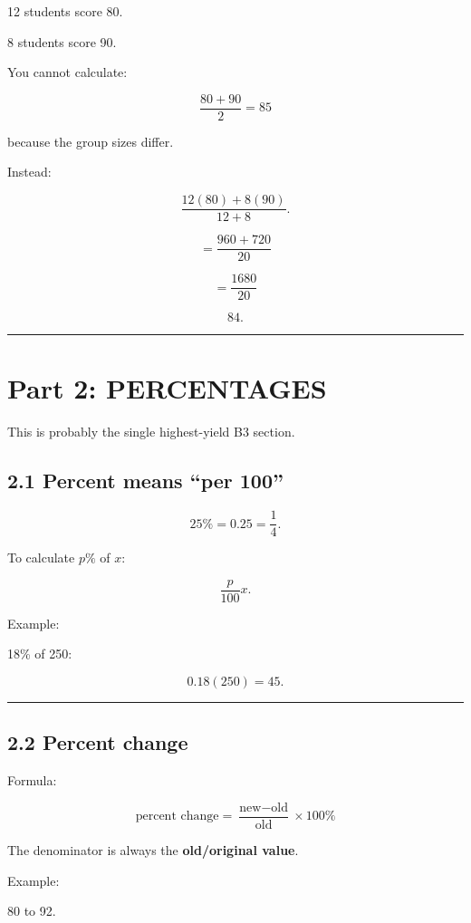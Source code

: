 \documentclass[
]{article}
\begin{document}
12 students score 80.

8 students score 90.

You cannot calculate:

\[
\frac{80+90}{2}=85
\]

because the group sizes differ.

Instead:

\[
\frac{12(80)+8(90)}{12+8}.
\]

\[
=
\frac{960+720}{20}
\]

\[
=
\frac{1680}{20}
\]

\[
\boxed{84}.
\]

\begin{center}\rule{0.5\linewidth}{0.5pt}\end{center}

\section{Part 2: PERCENTAGES}\label{part-2-percentages}

This is probably the single highest-yield B3 section.

\subsection{2.1 Percent means ``per 100''}\label{percent-means-per-100}

\[
25\%=0.25=\frac14.
\]

To calculate \(p\%\) of \(x\):

\[
\boxed{\frac p{100}x}.
\]

Example:

18\% of 250:

\[
0.18(250)=45.
\]

\begin{center}\rule{0.5\linewidth}{0.5pt}\end{center}

\subsection{2.2 Percent change}\label{percent-change}

Formula:

\[
\boxed{
\text{percent change}
=
\frac{\text{new}-\text{old}}{\text{old}}\times100\%
}
\]

The denominator is always the \textbf{old/original value}.

Example:

80 to 92.
\end{document}
